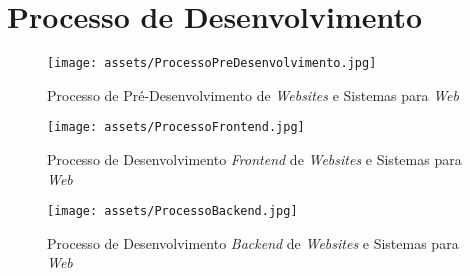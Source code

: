 \chapter{Processo de Desenvolvimento}

\clearpage
\begin{figure}[htbp]
  \begin{center}
  \texttt{[image: assets/ProcessoPreDesenvolvimento.jpg]}\\
  \end{center}
  \caption[Processo de Pré-Desenvolvimento de Websites e Sistemas para Web]{Processo de Pré-Desenvolvimento de \textit{Websites} e Sistemas para \textit{Web}}
  \label{fig:ProcessoPreDesenvolvimento}
\end{figure}
\clearpage
\begin{figure}[htbp]
  \begin{center}
  \texttt{[image: assets/ProcessoFrontend.jpg]}\\
  \end{center}
  \caption[Processo de Desenvolvimento Frontend de Websites e Sistemas para Web]{Processo de Desenvolvimento \textit{Frontend} de \textit{Websites} e Sistemas para \textit{Web}}
  \label{fig:ProcessoDesenvolvimentoFrontend}
\end{figure}

\begin{figure}[htbp]
  \begin{center}
  \texttt{[image: assets/ProcessoBackend.jpg]}\\
  \end{center}
  \caption[Processo de Desenvolvimento Backend de Websites e Sistemas para Web]{Processo de Desenvolvimento \textit{Backend} de \textit{Websites} e Sistemas para \textit{Web}}
  \label{fig:ProcessoDesenvolvimentoBackend}
\end{figure}

